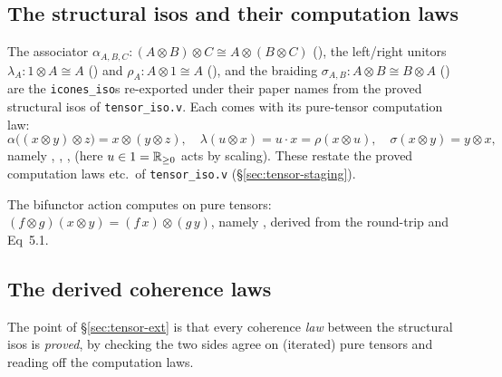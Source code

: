 \subsection{The structural isos and their computation laws}%
\label{sec:struct-isos}

\begin{definition}\label{def:struct-isos}
\rocqok
{}\rocqok
{}\rocqok
{}\rocqok
{}
The associator $\alpha_{A,B,C} : (A \otimes B) \otimes C \cong A
\otimes (B \otimes C)$
(), the left/right unitors
$\lambda_A : 1 \otimes A \cong A$
() and $\rho_A : A \otimes 1 \cong
A$ (), and the braiding
$\sigma_{A,B} : A \otimes B \cong B \otimes A$
() are the
\texttt{icones\_iso}s re-exported under their paper names from the
proved structural isos of \texttt{tensor\_iso.v}. Each comes with its
pure-tensor computation law:
\[
  \alpha\bigl((x \otimes y) \otimes z\bigr) = x \otimes (y \otimes z),
  \quad
  \lambda(u \otimes x) = u \cdot x = \rho(x \otimes u),
  \quad
  \sigma(x \otimes y) = y \otimes x,
\]
namely ,
,
,
 (here $u \in 1 = \mathbb{R}_{\geq 0}$ acts by
scaling). These restate the proved computation laws
 etc.\ of \texttt{tensor\_iso.v}
(\S\ref{sec:tensor-staging}).
\end{definition}

The bifunctor action computes on pure tensors:
$(f \otimes g)(x \otimes y) = (f\,x) \otimes (g\,y)$, namely
\rocqok, derived from the
round-trip  and
Eq~5.1.

\subsection{The derived coherence laws}\label{sec:coherence}

The point of \S\ref{sec:tensor-ext} is that every coherence \emph{law}
between the structural isos is \emph{proved}, by checking the two sides
agree on (iterated) pure tensors and reading off the computation laws.

